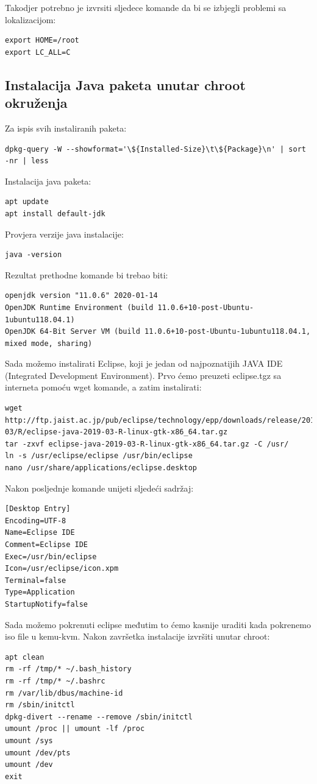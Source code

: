 \documentclass[12pt,vi]{mitthesis}
\begin{document}
\noindent
Takodjer potrebno je izvrsiti sljedece komande da bi se izbjegli problemi sa lokalizacijom:
\begin{lstlisting}[style=BashInputStyle]
export HOME=/root
export LC_ALL=C
\end{lstlisting}

\subsection*{Instalacija Java paketa unutar chroot okruženja}
\noindent
Za ispis svih instaliranih paketa:
\begin{lstlisting}[style=BashInputStyle]
dpkg-query -W --showformat='\${Installed-Size}\t\${Package}\n' | sort -nr | less
\end{lstlisting}

\noindent
Instalacija java paketa:
\begin{lstlisting}[style=BashInputStyle]
apt update
apt install default-jdk
\end{lstlisting}
Provjera verzije java instalacije:
\begin{lstlisting}[style=BashInputStyle]
java -version
\end{lstlisting}
Rezultat prethodne komande bi trebao biti:
\begin{lstlisting}[style=BashInputStyle]
openjdk version "11.0.6" 2020-01-14
OpenJDK Runtime Environment (build 11.0.6+10-post-Ubuntu-1ubuntu118.04.1)
OpenJDK 64-Bit Server VM (build 11.0.6+10-post-Ubuntu-1ubuntu118.04.1, mixed mode, sharing)
\end{lstlisting}
Sada možemo instalirati Eclipse, koji je jedan od najpoznatijih JAVA IDE (Integrated Development Environment). Prvo ćemo preuzeti eclipse.tgz sa interneta pomoću wget komande, a zatim instalirati:
\begin{lstlisting}[style=BashInputStyle]
wget http://ftp.jaist.ac.jp/pub/eclipse/technology/epp/downloads/release/2019-03/R/eclipse-java-2019-03-R-linux-gtk-x86_64.tar.gz
tar -zxvf eclipse-java-2019-03-R-linux-gtk-x86_64.tar.gz -C /usr/
ln -s /usr/eclipse/eclipse /usr/bin/eclipse
nano /usr/share/applications/eclipse.desktop
\end{lstlisting}
Nakon posljednje komande unijeti sljedeći sadržaj:
\begin{lstlisting}[style=BashInputStyle]
[Desktop Entry]
Encoding=UTF-8
Name=Eclipse IDE
Comment=Eclipse IDE
Exec=/usr/bin/eclipse
Icon=/usr/eclipse/icon.xpm
Terminal=false
Type=Application
StartupNotify=false
\end{lstlisting}
Sada možemo pokrenuti eclipse međutim to ćemo kasnije uraditi kada pokrenemo iso file u kemu-kvm.
\noindent
Nakon završetka instalacije izvršiti unutar chroot:
\begin{lstlisting}[style=BashInputStyle]
apt clean
rm -rf /tmp/* ~/.bash_history
rm -rf /tmp/* ~/.bashrc
rm /var/lib/dbus/machine-id
rm /sbin/initctl
dpkg-divert --rename --remove /sbin/initctl
umount /proc || umount -lf /proc
umount /sys
umount /dev/pts
umount /dev
exit
\end{lstlisting}
\end{document}
